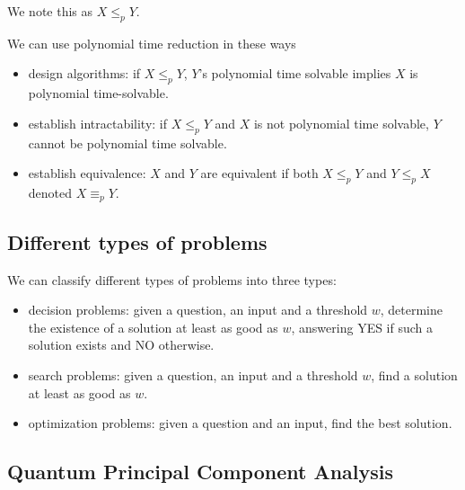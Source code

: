\documentclass[11pt]{article}
\begin{document}
We note this as $X \le_p Y$.

We can use polynomial time reduction in these ways

\begin{itemize}
	\item design algorithms: if $X \le_p Y$, $Y$'s polynomial time solvable implies $X$ is polynomial time-solvable.
	\item establish intractability: if $X \le_p Y$ and $X$ is not polynomial time solvable, $Y$ cannot be polynomial time solvable.
	\item establish equivalence: $X$ and $Y$ are equivalent if both $X \le_p Y$ and $Y \le_p X$ denoted $X \equiv_p Y$.
\end{itemize}

\subsection{Different types of problems}

We can classify different types of problems into three types:

\begin{itemize}
	\item decision problems: given a question, an input and a threshold $w$, determine the existence of a solution at least as good as $w$, answering YES if such a solution exists and NO otherwise.
	\item search problems: given a question, an input and a threshold $w$, find a solution at least as good as $w$.
	\item optimization problems: given a question and an input, find the best solution.
\end{itemize}

\subsection{Quantum Principal Component Analysis}



\end{document}
